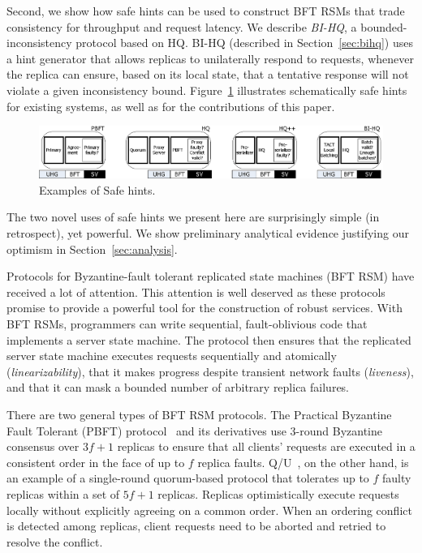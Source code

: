 \documentclass[twocolumn,10pt]{article}
\begin{document}
Second, we show how safe hints can be used to construct BFT RSMs that
trade consistency for throughput and request latency. We describe
\emph{BI-HQ}, a bounded-inconsistency protocol based on HQ. BI-HQ
(described in Section~\ref{sec:bihq}) uses a hint generator that
allows replicas to unilaterally respond to requests, whenever the
replica can ensure, based on its local state, that a tentative response will
not violate a given inconsistency bound.  Figure~\ref{fig:Examples}
illustrates schematically safe hints for existing systems, as well as
for the contributions of this paper.

\begin{figure}
\centering
\includegraphics{Examples.eps}
\caption{Examples of Safe hints.
}
\label{fig:Examples} 
\end{figure}



The two novel uses of safe hints we present here are surprisingly
simple (in retrospect), yet powerful.  We show preliminary analytical
evidence justifying our optimism in Section~\ref{sec:analysis}.



Protocols for Byzantine-fault tolerant replicated state machines (BFT
RSM) have received a lot of attention. This attention is well deserved
as these protocols promise to provide a powerful tool for the
construction of robust services. With BFT RSMs, programmers can write
sequential, fault-oblivious code that implements a server state
machine. The protocol then ensures that the replicated server state
machine executes requests sequentially and atomically
(\emph{linearizability}), that it makes progress despite transient
network faults (\emph{liveness}), and that it can mask a bounded number
of arbitrary replica failures.

There are two general types of BFT RSM protocols. The Practical
Byzantine Fault Tolerant (PBFT) protocol~\cite{Castro1999} and its
derivatives use 3-round Byzantine consensus over $3f+1$ replicas to
ensure that all clients' requests are executed in a consistent order
in the face of up to $f$ replica faults.
Q/U~\cite{fault-scalable-sosp-05}, on the other hand, is an example of
a single-round quorum-based protocol that tolerates up to $f$ faulty
replicas within a set of $5f+1$ replicas. Replicas optimistically
execute requests locally without explicitly agreeing on a common
order. When an ordering conflict is detected among replicas, client
requests need to be aborted and retried to resolve the conflict.
\end{document}
